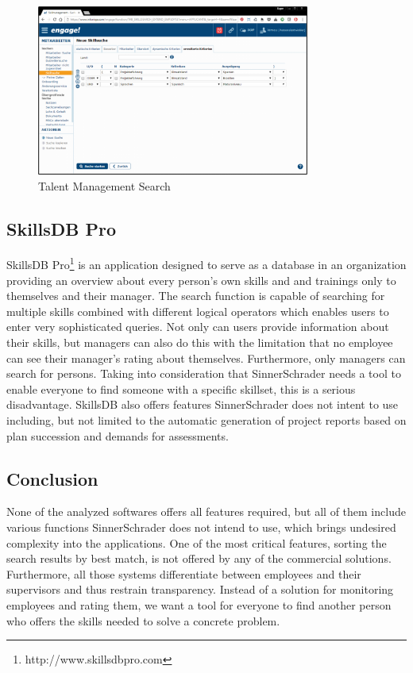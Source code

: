 \begin{figure}[!htp]
    \centering
    \includegraphics[width=0.8\textwidth]{images/talent_management_-_skillmanagement_-_skillsuche.png}
    \caption{Talent Management Search}
    \label{fig:talent_management}
\end{figure}

\subsection{SkillsDB Pro}
SkillsDB Pro\footnote{http://www.skillsdbpro.com} is an application designed to serve as a database in an organization providing an overview about every person’s own skills and and trainings only to themselves and their manager. The search function is capable of searching for multiple skills combined with different logical operators which enables users to enter very sophisticated queries.
Not only can users provide information about their skills, but managers can also do this with the limitation that no employee can see their manager’s rating about themselves.
Furthermore, only managers can search for persons. Taking into consideration that SinnerSchrader needs a tool to enable everyone to find someone with a specific skillset, this is a serious disadvantage.
SkillsDB also offers features SinnerSchrader does not intent to use including, but not limited to the automatic generation of project reports based on plan succession and demands for assessments.

\subsection{Conclusion}
None of the analyzed softwares offers all features required, but all of them include various functions SinnerSchrader does not intend to use, which brings undesired complexity into the applications.
One of the most critical features, sorting the search results by best match, is not offered by any of the commercial solutions.
Furthermore, all those systems differentiate between employees and their supervisors and thus restrain transparency. Instead of a solution for monitoring employees and rating them, we want a tool for everyone to find another person who offers the skills needed to solve a concrete problem.

